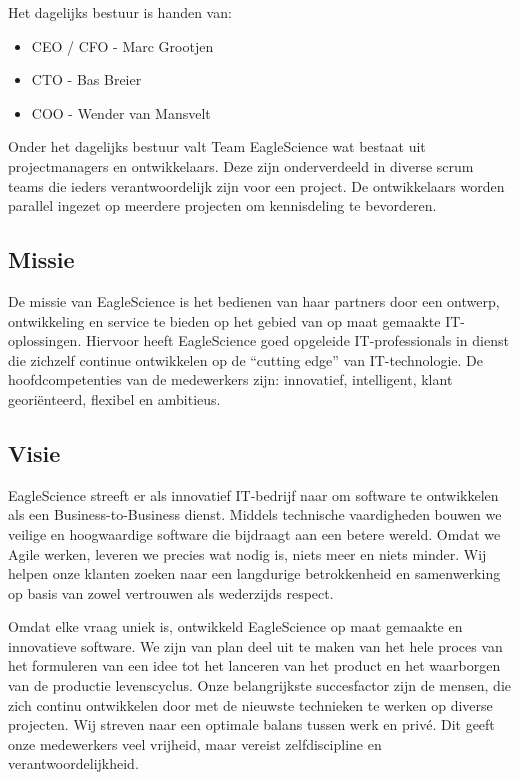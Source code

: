 Het dagelijks bestuur is handen van:
\begin{itemize}
\item CEO / CFO - Marc Grootjen
\item CTO - Bas Breier
\item COO - Wender van Mansvelt
\end{itemize}
Onder het dagelijks bestuur valt Team EagleScience wat bestaat uit projectmanagers en ontwikkelaars. Deze zijn onderverdeeld in diverse scrum teams die ieders verantwoordelijk zijn voor een project. De ontwikkelaars worden parallel ingezet op meerdere projecten om kennisdeling te bevorderen.

\subsection{Missie}\label{subsec:missie}

De missie van EagleScience is het bedienen van haar partners door een ontwerp, ontwikkeling en service te bieden op het gebied van op maat gemaakte IT-oplossingen. Hiervoor heeft EagleScience goed opgeleide IT-professionals in dienst die zichzelf continue ontwikkelen op de “cutting edge” van IT-technologie. De hoofdcompetenties van de medewerkers zijn: innovatief, intelligent, klant georiënteerd, flexibel en ambitieus.

\subsection{Visie}\label{subsec:visie}
EagleScience streeft er als innovatief IT-bedrijf naar om software te ontwikkelen als een Business-to-Business dienst. Middels technische vaardigheden bouwen we veilige en hoogwaardige software die bijdraagt aan een betere wereld. Omdat we Agile werken, leveren we precies wat nodig is, niets meer en niets minder. Wij helpen onze klanten zoeken naar een langdurige betrokkenheid en samenwerking op basis van zowel vertrouwen als wederzijds respect.

Omdat elke vraag uniek is, ontwikkeld EagleScience op maat gemaakte en innovatieve software.  We zijn van plan deel uit te maken van het hele proces van het formuleren van een idee tot het lanceren van het product en het waarborgen van de productie levenscyclus. Onze belangrijkste succesfactor zijn de mensen, die zich continu ontwikkelen door met de nieuwste technieken te werken op diverse projecten. Wij streven naar een optimale balans tussen werk en privé. Dit geeft onze medewerkers veel vrijheid, maar vereist zelfdiscipline en verantwoordelijkheid.

